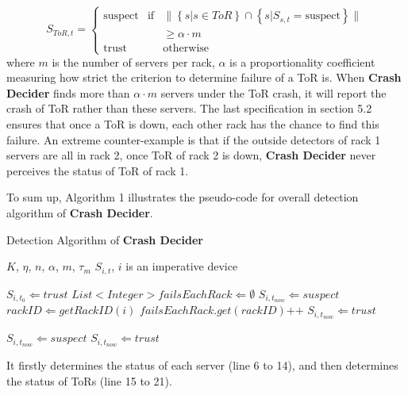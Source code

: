 \documentclass{sig-alternate-05-2015}
\begin{document}
\begin{equation}
S_{ToR,t}=\left\{
    \begin{array}{lcl}
    \text{suspect} & \text{if} & \|\left\{s|s\in ToR\right\} \cap \left\{s|S_{s,t}=\text{suspect}\right\}\| \\
    && \geq \alpha \cdot m\\
    \text{trust} && \text{otherwise}
    \end{array}
\right.
\end{equation}
where $m$ is the number of servers per rack, $\alpha$ is a  proportionality coefficient measuring how strict the criterion to determine failure of a ToR is. When \textbf{Crash Decider} finds more than $\alpha \cdot m$ servers under the ToR crash, it will report the crash of ToR rather than these servers. The last specification in section 5.2 ensures that once a ToR is down, each other rack has the chance to find this failure. An extreme counter-example is that if the outside detectors of rack 1 servers are all in rack 2, once ToR of rack 2 is down, \textbf{Crash Decider} never perceives the status of ToR of rack 1.

To sum up, Algorithm 1 illustrates the pseudo-code for overall detection algorithm of \textbf{Crash Decider}.

\renewcommand{\algorithmicrequire}{\textbf{Input:}}
\renewcommand{\algorithmicensure}{\textbf{Output:}}
\begin{algorithm}
	\caption{Detection Algorithm of \textbf{Crash Decider}}
	\begin{algorithmic}[1]
		\REQUIRE $K$, $\eta$, $n$, $\alpha$, $m$, $\tau_m$
		\ENSURE $S_{i,t}$, $i$ is an imperative device
	
            \STATE $S_{i,t_0} \Leftarrow trust$
        \ENDFOR
            \STATE $List<Integer> failsEachRack \Leftarrow \emptyset$
                    \STATE $S_{i,t_{now}} \Leftarrow suspect$
                    \STATE $rackID \Leftarrow getRackID(i)$
                    \STATE $failsEachRack.get(rackID)\text{++}$
                \ELSE
                    \STATE $S_{i,t_{now}} \Leftarrow trust$
                \ENDIF
            \ENDFOR

                    \STATE $S_{i,t_{now}} \Leftarrow suspect$
                \ELSE
                    \STATE $S_{i,t_{now}} \Leftarrow trust$
                \ENDIF
            \ENDFOR
		\ENDWHILE
	\end{algorithmic}
\end{algorithm}
It firstly determines the status of each server (line 6 to 14), and then determines the status of ToRs (line 15 to 21).
\end{document}
